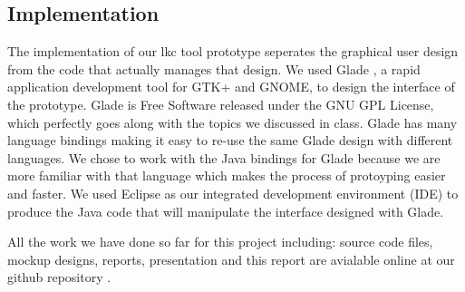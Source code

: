 \documentclass{chi2009}
\begin{document}
\subsection{Implementation}
The implementation of our \textsf{lkc} tool prototype seperates the graphical user design from the code that actually manages that design. We used Glade
\cite{glade:2010}, a rapid application development tool for GTK+ and GNOME, to design the interface of the prototype. Glade is Free Software released under the
GNU GPL License, which perfectly goes along with the topics we discussed in class. Glade has many language bindings making it easy to re-use the same Glade
design with different languages. We chose to work with the Java bindings for Glade \cite{java-gnome:2010} because we are more familiar with that language which
makes the process of protoyping easier and faster. We used Eclipse \cite{eclipse:2010} as our integrated development environment (IDE) to produce the Java code
that will manipulate the interface designed with Glade.

All the work we have done so far for this project including: source code files, mockup designs, reports, presentation and this report are avialable online at
our github repository \cite{git-lkc:2010}.
\end{document}
